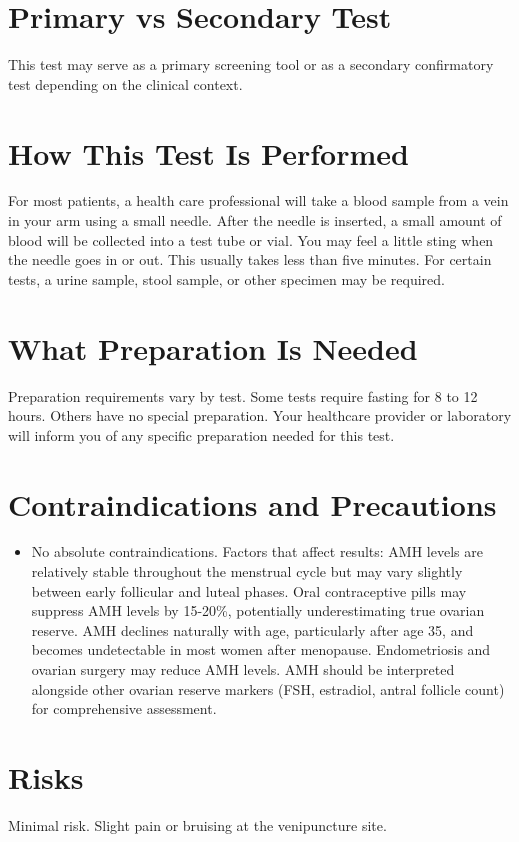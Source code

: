 \section*{Primary vs Secondary Test}
This test may serve as a primary screening tool or as a secondary confirmatory test depending on the clinical context.

\section*{How This Test Is Performed}
For most patients, a health care professional will take a blood sample from a vein in your arm using a small needle. After the needle is inserted, a small amount of blood will be collected into a test tube or vial. You may feel a little sting when the needle goes in or out. This usually takes less than five minutes. For certain tests, a urine sample, stool sample, or other specimen may be required.

\section*{What Preparation Is Needed}
Preparation requirements vary by test. Some tests require fasting for 8 to 12 hours. Others have no special preparation. Your healthcare provider or laboratory will inform you of any specific preparation needed for this test.

\section*{Contraindications and Precautions}
\begin{itemize}
  \item No absolute contraindications. Factors that affect results: AMH levels are relatively stable throughout the menstrual cycle but may vary slightly between early follicular and luteal phases. Oral contraceptive pills may suppress AMH levels by 15-20\%, potentially underestimating true ovarian reserve. AMH declines naturally with age, particularly after age 35, and becomes undetectable in most women after menopause. Endometriosis and ovarian surgery may reduce AMH levels. AMH should be interpreted alongside other ovarian reserve markers (FSH, estradiol, antral follicle count) for comprehensive assessment.
\end{itemize}
\section*{Risks}
Minimal risk. Slight pain or bruising at the venipuncture site.

